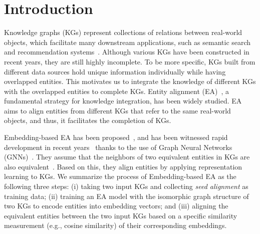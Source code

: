 

\section{Introduction}
\label{sec:intro}
Knowledge graphs (KGs) represent collections of relations between real-world objects, which facilitate many downstream applications, such as semantic search~\cite{XiongPC17} and recommendation systems~\cite{ZhangYLXM2016}.
Although various KGs have been constructed in recent years, they are still highly incomplete. To be more specific, KGs built from different data sources hold unique information individually while having overlapped entities. This motivates us to integrate the knowledge of different KGs with the overlapped entities to complete KGs.
Entity alignment (EA)~\cite{MTransE17}, a fundamental strategy for knowledge integration, has been widely studied. EA aims to align entities from different KGs that refer to the same real-world objects, and thus, it facilitates the completion of KGs.

Embedding-based EA has been proposed~\cite{MTransE17}, and has been witnessed rapid development in recent years~\cite{KECG19, RREA20, AliNet20, HyperKA20, DualAMN21} thanks to the use of Graph Neural Networks (GNNs)~\cite{GCN17, GAT18, GraphSAGE17}.
They assume that the neighbors of two equivalent entities in KGs are also equivalent~\cite{AttrGNN20}. Based on this, they align entities by applying representation learning to KGs. We summarize the process of  Embedding-based EA as the following three steps: (i) taking two input KGs and collecting \emph{seed alignment} as training data; (ii) training an EA model with the isomorphic graph structure of two KGs to encode entities into embedding vectors; and (iii) aligning the equivalent entities between the two input KGs based on a specific similarity measurement (e.g., cosine similarity) of their corresponding embeddings.

